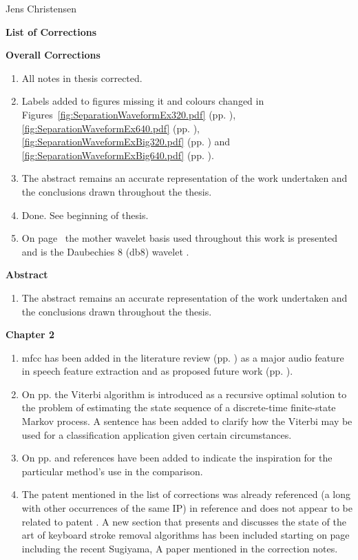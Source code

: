 \clearpage
\thispagestyle{empty}
Jens Christensen

\textbf{List of Corrections}

\textbf{Overall Corrections}

\begin{enumerate}
  \item All notes in thesis corrected.
  \item Labels added to figures missing it and colours changed in Figures~\ref{fig:SeparationWaveformEx320.pdf} (pp. \pageref{fig:SeparationWaveformEx320.pdf}), \ref{fig:SeparationWaveformEx640.pdf} (pp. \pageref{fig:SeparationWaveformEx640.pdf}), \ref{fig:SeparationWaveformExBig320.pdf} (pp. \pageref{fig:SeparationWaveformExBig320.pdf}) and \ref{fig:SeparationWaveformExBig640.pdf} (pp. \pageref{fig:SeparationWaveformExBig640.pdf}).
  \item The abstract remains an accurate representation of the work undertaken and the conclusions drawn throughout the thesis.
  \item Done. See beginning of thesis.
  \item On page~\pageref{corrections:motherWavelet} the mother wavelet basis used throughout this work is presented and is the Daubechies 8 (db8) wavelet \cite{Daubechies1992}.
\end{enumerate}

\textbf{Abstract}
\begin{enumerate}
  \item The abstract remains an accurate representation of the work undertaken and the conclusions drawn throughout the thesis.
\end{enumerate}

\textbf{Chapter 2}
\begin{enumerate}
\item \gls{mfcc} has been added in the literature review (pp. \pageref{corrections:mfcc1}) as a major audio feature in speech feature extraction and as proposed future work (pp. \pageref{corrections:mfcc2}).
    \item On pp. \pageref{corrections:viterbi} the Viterbi algorithm is introduced as a recursive optimal solution to the problem of estimating the state sequence of a discrete-time finite-state Markov process. A sentence has been added to clarify how the Viterbi may be used for a classification application given certain circumstances.
    \item On pp. \pageref{fig:LitRev_DetectCompare} and \pageref{fig:LitRev_DetectCompare2} references have been added to indicate the inspiration for the particular method's use in the comparison.
    \item The patent mentioned in the list of corrections was already referenced (a long with other occurrences of the same IP) in reference \cite{Seltzer2011Patent} and does not appear to be related to patent \cite{US8233353}. A new section that presents and discusses the state of the art of keyboard stroke removal algorithms has been included starting on page \pageref{corrections:methods} including the recent Sugiyama, A paper mentioned in the correction notes.
    \end{enumerate}

